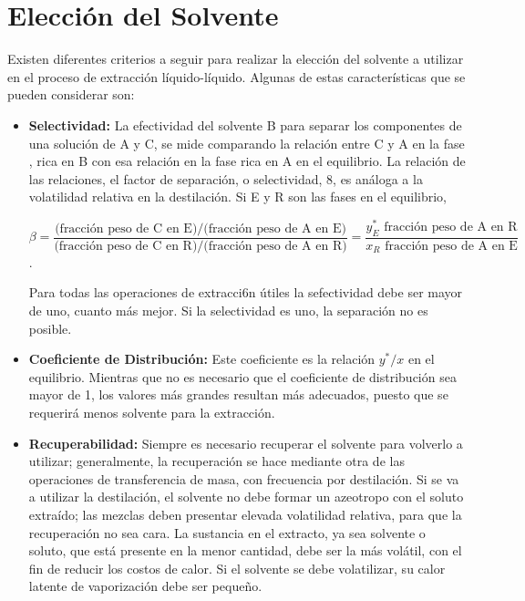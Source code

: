 \documentclass[11pt]{book}
\begin{document}
\section{Elección del Solvente}

Existen diferentes criterios a seguir para realizar la elección del solvente a utilizar en el proceso de extracción líquido-líquido. Algunas de estas características que se pueden considerar son:

\begin{itemize}
    \item \textbf{Selectividad:} La efectividad del solvente B para separar los componentes de una solución de A y C, se mide comparando la relación entre C y A en la fase , rica en B con esa relación en la fase rica en A en el equilibrio. La relación de las relaciones, el factor de separación, o selectividad, 8, es análoga a la volatilidad relativa en la destilación. Si E y R son las fases en el equilibrio,
    
    \begin{equation*}
        \beta = \frac{\textrm{(fracción peso de C en E)/(fracción peso de A en E)}}{\textrm{(fracción peso de C en R)/(fracción peso de A en R)}} = \frac{y_E^* \textrm{ fracción peso de A en R}}{x_R \textrm{ fracción peso de A en E}}
    \end{equation*}.
    
    Para todas las operaciones de extracci6n útiles la sefectividad debe ser mayor de uno, cuanto más mejor. Si la selectividad es uno, la separación no es posible.
    
    \item \textbf{Coeficiente de Distribución:} Este coeficiente es la relación $y^*/x$ en el equilibrio. Mientras que no es necesario que el coeficiente de distribución sea mayor de 1, los valores más grandes resultan más adecuados, puesto que se requerirá menos solvente para la extracción.
    
    \item \textbf{Recuperabilidad:} Siempre es necesario recuperar el solvente para volverlo a utilizar; generalmente, la recuperación se hace mediante otra de las operaciones de transferencia de masa, con frecuencia por destilación. Si se va a utilizar la destilación, el solvente no debe formar un azeotropo con el soluto extraído; las mezclas deben presentar elevada volatilidad relativa, para que la recuperación no sea cara. La sustancia en el extracto, ya sea solvente o soluto, que está presente en la menor cantidad, debe ser la más volátil, con el fin de reducir los costos de calor. Si el solvente se debe volatilizar, su calor latente de vaporización debe ser pequeño.
    

\end{itemize}
\end{document}
